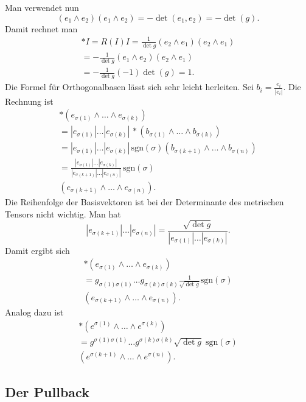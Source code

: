 \documentclass[a4paper,11pt,fleqn,twocolumn,twoside]{scrartcl}
\numberwithin{equation}{section}
\begin{document}
Man verwendet nun
\[(e_1\wedge e_2)(e_1\wedge e_2) = -\det(e_1,e_2) = -\det(g).\]
Damit rechnet man
\begin{gather}
*I = R(I)I = \frac{1}{\det g}(e_2\wedge e_1)(e_2\wedge e_1)\\
= -\frac{1}{\det g}(e_1\wedge e_2)(e_2\wedge e_1)\\
= -\frac{1}{\det g}(-1)\det(g) = 1.
\end{gather}
%
Die Formel für Orthogonalbasen lässt sich sehr leicht herleiten.
Sei $b_i=\frac{e_i}{|e_i|}$. Die Rechnung ist
\begin{gather*}
*(e_{\sigma(1)}\wedge\ldots\wedge e_{\sigma(k)})\\
= |e_{\sigma(1)}|\ldots|e_{\sigma(k)}|\,
{*}(b_{\sigma(1)}\wedge\ldots\wedge b_{\sigma(k)})\\
= |e_{\sigma(1)}|\ldots|e_{\sigma(k)}|\,
\mathrm{sgn}(\sigma)(b_{\sigma(k+1)}
\wedge\ldots\wedge b_{\sigma(n)})\\
= \frac{|e_{\sigma(1)}|\ldots|e_{\sigma(k)}|}
{|e_{\sigma(k+1)}|\ldots|e_{\sigma(n)}|}\,
\mathrm{sgn}(\sigma)\\
(e_{\sigma(k+1)} \wedge\ldots\wedge e_{\sigma(n)}).
\end{gather*}
Die Reihenfolge der Basisvektoren ist bei der Determinante
des metrischen Tensors nicht wichtig. Man hat
\begin{equation}
|e_{\sigma(k+1)}|\ldots|e_{\sigma(n)}|
= \frac{\sqrt{\det g}}{|e_{\sigma(1)}|\ldots|e_{\sigma(k)}|}.
\end{equation}
Damit ergibt sich
\begin{gather*}
*(e_{\sigma(1)}\wedge\ldots\wedge e_{\sigma(k)})\\
= g_{\sigma(1)\sigma(1)}\ldots g_{\sigma(k)\sigma(k)}
\frac{1}{\sqrt{\det g}} \mathrm{sgn}(\sigma)\\
(e_{\sigma(k+1)} \wedge\ldots\wedge e_{\sigma(n)}).
\end{gather*}
Analog dazu ist
\begin{gather*}
*(e^{\sigma(1)}\wedge\ldots\wedge e^{\sigma(k)})\\
= g^{\sigma(1)\sigma(1)}\ldots g^{\sigma(k)\sigma(k)}
\sqrt{\det g}\;\mathrm{sgn}(\sigma)\\
(e^{\sigma(k+1)} \wedge\ldots\wedge e^{\sigma(n)}).
\end{gather*}

\subsection{Der Pullback}
\end{document}
